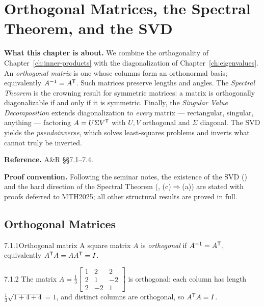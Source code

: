 \chapter{Orthogonal Matrices, the Spectral Theorem, and the SVD}
\label{ch:orthogonalization}

\begin{roadmap}
\noindent\textbf{What this chapter is about.}\;
We combine the orthogonality of Chapter~\ref{ch:inner-products} with the diagonalization of Chapter~\ref{ch:eigenvalues}. An \emph{orthogonal matrix} is one whose columns form an orthonormal basis; equivalently $A^{-1}=A^{\mathsf{T}}$. Such matrices preserve lengths and angles. The \emph{Spectral Theorem} is the crowning result for symmetric matrices: a matrix is orthogonally diagonalizable if and only if it is symmetric. Finally, the \emph{Singular Value Decomposition} extends diagonalization to \emph{every} matrix --- rectangular, singular, anything --- factoring $A=U\Sigma V^{\mathsf{T}}$ with $U,V$ orthogonal and $\Sigma$ diagonal. The SVD yields the \emph{pseudoinverse}, which solves least-squares problems and inverts what cannot truly be inverted.
\medskip

\noindent\textbf{Reference.}\; A\&R \S\S7.1--7.4.

\noindent\textbf{Proof convention.}\; Following the seminar notes, the existence of the SVD () and the hard direction of the Spectral Theorem (, (c)$\Rightarrow$(a)) are stated with proofs deferred to MTH2025; all other structural results are proved in full.
\end{roadmap}

\section{Orthogonal Matrices}
\label{sec:7.1}

\begin{defns}{7.1.1}{Orthogonal matrix}
A square matrix $A$ is \emph{orthogonal} if $A^{-1}=A^{\mathsf{T}}$, equivalently $A^{\mathsf{T}} A=AA^{\mathsf{T}}=I$.
\end{defns}

\begin{exmp}{7.1.2}{}
The matrix $A=\tfrac13\left[\begin{smallmatrix}1&2&2\\2&1&-2\\2&-2&1\end{smallmatrix}\right]$ is orthogonal: each column has length $\tfrac13\sqrt{1+4+4}=1$, and distinct columns are orthogonal, so $A^{\mathsf{T}} A=I$.
\end{exmp}

